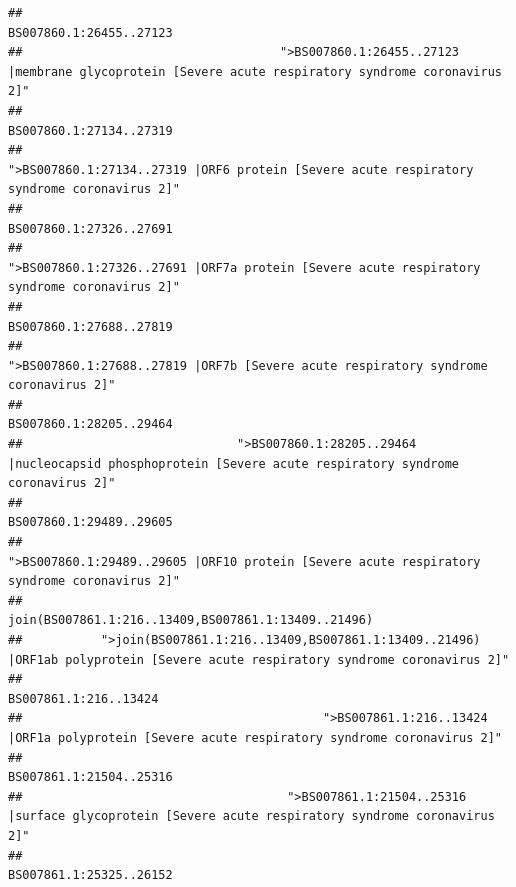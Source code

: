 \documentclass[
]{article}
\begin{document}
\begin{verbatim}
##                                                                                                                BS007860.1:26455..27123 
##                                    ">BS007860.1:26455..27123 |membrane glycoprotein [Severe acute respiratory syndrome coronavirus 2]" 
##                                                                                                                BS007860.1:27134..27319 
##                                             ">BS007860.1:27134..27319 |ORF6 protein [Severe acute respiratory syndrome coronavirus 2]" 
##                                                                                                                BS007860.1:27326..27691 
##                                            ">BS007860.1:27326..27691 |ORF7a protein [Severe acute respiratory syndrome coronavirus 2]" 
##                                                                                                                BS007860.1:27688..27819 
##                                                    ">BS007860.1:27688..27819 |ORF7b [Severe acute respiratory syndrome coronavirus 2]" 
##                                                                                                                BS007860.1:28205..29464 
##                              ">BS007860.1:28205..29464 |nucleocapsid phosphoprotein [Severe acute respiratory syndrome coronavirus 2]" 
##                                                                                                                BS007860.1:29489..29605 
##                                            ">BS007860.1:29489..29605 |ORF10 protein [Severe acute respiratory syndrome coronavirus 2]" 
##                                                                                    join(BS007861.1:216..13409,BS007861.1:13409..21496) 
##           ">join(BS007861.1:216..13409,BS007861.1:13409..21496) |ORF1ab polyprotein [Severe acute respiratory syndrome coronavirus 2]" 
##                                                                                                                  BS007861.1:216..13424 
##                                          ">BS007861.1:216..13424 |ORF1a polyprotein [Severe acute respiratory syndrome coronavirus 2]" 
##                                                                                                                BS007861.1:21504..25316 
##                                     ">BS007861.1:21504..25316 |surface glycoprotein [Severe acute respiratory syndrome coronavirus 2]" 
##                                                                                                                BS007861.1:25325..26152 

\end{verbatim}
\end{document}
